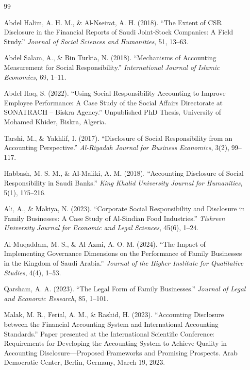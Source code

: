 \documentclass[10pt]{NSP1}
\begin{document}
	\begin{thebibliography}{99}
		
		Abdel Halim, A. H. M., \& Al-Nseirat, A. H. (2018). ``The Extent of CSR Disclosure in the Financial Reports of Saudi Joint-Stock Companies: A Field Study.'' \emph{Journal of Social Sciences and Humanities}, 51, 13--63.
		
		Abdel Salam, A., \& Bin Turkia, N. (2018). ``Mechanisms of Accounting Measurement for Social Responsibility.'' \emph{International Journal of Islamic Economics}, 69, 1--11.
		
		Abdel Haq, S. (2022). ``Using Social Responsibility Accounting to Improve Employee Performance: A Case Study of the Social Affairs Directorate at SONATRACH -- Biskra Agency.'' Unpublished PhD Thesis, University of Mohamed Khider, Biskra, Algeria.
		
		Tarshi, M., \& Yakhlif, I. (2017). ``Disclosure of Social Responsibility from an Accounting Perspective.'' \emph{Al-Riyadah Journal for Business Economics}, 3(2), 99--117.
		
		Habbash, M. S. M., \& Al-Maliki, A. M. (2018). ``Accounting Disclosure of Social Responsibility in Saudi Banks.'' \emph{King Khalid University Journal for Humanities}, 5(1), 175--216.
		
		Ali, A., \& Makiya, N. (2023). ``Corporate Social Responsibility and Disclosure in Family Businesses: A Case Study of Al-Sindian Food Industries.'' \emph{Tishreen University Journal for Economic and Legal Sciences}, 45(6), 1--24.
		
		Al-Muqaddam, M. S., \& Al-Azmi, A. O. M. (2024). ``The Impact of Implementing Governance Dimensions on the Performance of Family Businesses in the Kingdom of Saudi Arabia.'' \emph{Journal of the Higher Institute for Qualitative Studies}, 4(4), 1--53.
		
		Qarsham, A. A. (2023). ``The Legal Form of Family Businesses.'' \emph{Journal of Legal and Economic Research}, 85, 1--101.
		
		Malak, M. R., Ferial, A. M., \& Rashid, H. (2023). ``Accounting Disclosure between the Financial Accounting System and International Accounting Standards.'' Paper presented at the International Scientific Conference: Requirements for Developing the Accounting System to Achieve Quality in Accounting Disclosure---Proposed Frameworks and Promising Prospects. Arab Democratic Center, Berlin, Germany, March 19, 2023.
		

\end{thebibliography}
\end{document}
